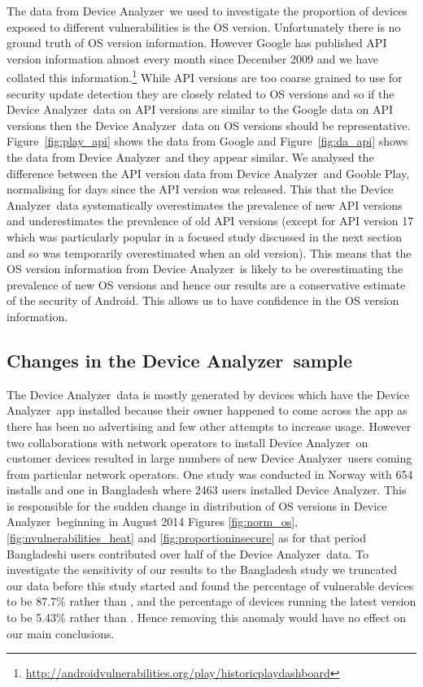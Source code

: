\documentclass{llncs}
\let\OldTodo\todo
\renewcommand{\todo}{\OldTodo}%
\newcommand{\todolater}[1]{\todo{#1}}%
\newcommand{\da}{Device Analyzer}
\begin{document}
The data from \da\ we used to investigate the proportion of devices exposed to different vulnerabilities is the OS version.
Unfortunately there is no ground truth of OS version information.
However Google has published API version information almost every month since December 2009 and we have collated this information.\footnote{\url{http://androidvulnerabilities.org/play/historicplaydashboard}}
While API versions are too coarse grained to use for security update detection they are closely related to OS versions and so if the \da\ data on API versions are similar to the Google data on API versions then the \da\ data on OS versions should be representative.
Figure~\ref{fig:play_api} shows the data from Google and Figure~\ref{fig:da_api} shows the data from \da\ and they appear similar.
We analysed the difference between the API version data from \da\ and Gooble Play, normalising for days since the API version was released.
This that the \da\ data systematically overestimates the prevalence of new API versions and underestimates the prevalence of old API versions (except for API version 17 which was particularly popular in a focused study discussed in the next section and so was temporarily overestimated when an old version).
This means that the OS version information from \da\ is likely to be overestimating the prevalence of new OS versions and hence our results are a conservative estimate of the security of Android.
This allows us to have confidence in the OS version information.
\todolater{we want a statistical metric to claim this strongly with.}


\subsection{Changes in the \da\ sample}
\label{sec:da_changes}
The \da\ data is mostly generated by devices which have the \da\ app installed because their owner happened to come across the app as there has been no advertising and few other attempts to increase usage.
However two collaborations with network operators to install \da\ on customer devices resulted in large numbers of new \da\ users coming from particular network operators.
One study was conducted in Norway with 654 installs and one in Bangladesh where 2463 users installed \da.
This is responsible for the sudden change in distribution of OS versions in \da\ beginning in August 2014 Figures \ref{fig:norm_os}, \ref{fig:nvulnerabilities_heat} and \ref{fig:proportioninsecure} as for that period Bangladeshi users contributed over half of the \da\ data.
To investigate the sensitivity of our results to the Bangladesh study we truncated our data before this study started and found the percentage of vulnerable devices to be 87.7\% rather than \daMeanInsecurityPercNominal, and the percentage of devices running the latest version to be 5.43\% rather than \daUpdatednessPercNominal.
Hence removing this anomaly would have no effect on our main conclusions.
\end{document}
